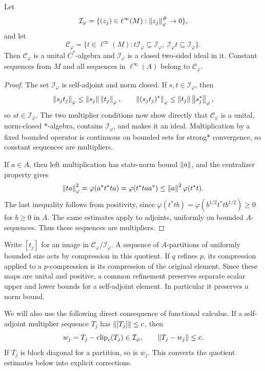 \begin{lemma}\label{lem:sequence-quotient}
Let
\[
 \mathcal I_\varphi=
 \{(z_j)\in\ell^\infty(M):\left\lVert z_j\right\rVert_\varphi^\#\to0\},
\]
and let
\[
 \mathcal C_\varphi=
 \{t\in\ell^\infty(M):
 t\mathcal I_\varphi\subseteq\mathcal I_\varphi,\
 \mathcal I_\varphi t\subseteq\mathcal I_\varphi\}.
\]
Then \(\mathcal C_\varphi\) is a unital \(C^*\)-algebra and
\(\mathcal I_\varphi\) is a closed two-sided ideal in it.
Constant sequences from \(M\) and all sequences in
\(\ell^\infty(A)\) belong to \(\mathcal C_\varphi\).
\end{lemma}
\begin{proof}
The set \(\mathcal I_\varphi\) is self-adjoint and norm closed.
If \(s,t\in\mathcal I_\varphi\), then
\[
 \left\lVert s_jt_j\right\rVert_\varphi\leq
 \left\lVert s_j\right\rVert\left\lVert t_j\right\rVert_\varphi,\qquad
 \left\lVert(s_jt_j)^*\right\rVert_\varphi\leq
 \left\lVert t_j\right\rVert\left\lVert s_j^*\right\rVert_\varphi ,
\]
so \(st\in\mathcal I_\varphi\).
The two multiplier conditions now show directly that
\(\mathcal C_\varphi\) is a unital, norm-closed \(*\)-algebra,
contains \(\mathcal I_\varphi\), and makes it an ideal.
Multiplication by a fixed bounded operator is continuous on bounded
sets for strong* convergence, so constant sequences are multipliers.

If \(a\in A\), then left multiplication has state-norm bound
\(\left\lVert a\right\rVert\), and the centralizer property gives
\[
 \left\lVert ta\right\rVert_\varphi^2
 =\varphi(a^*t^*ta)
 =\varphi(t^*t aa^*)
 \leq \left\lVert a\right\rVert^2\varphi(t^*t).
\]
The last inequality follows from positivity, since
\(\varphi(t^*t b)=\varphi(b^{1/2}t^*t b^{1/2})\geq0\) for
\(b\geq0\) in \(A\).
The same estimates apply to adjoints, uniformly on bounded
\(A\)-sequences. Thus these sequences are multipliers.
\end{proof}

Write \([t_j]\) for an image in
\(\mathcal C_\varphi/\mathcal I_\varphi\).
A sequence of \(A\)-partitions of uniformly bounded size acts by
compression in this quotient.
If \(q\) refines \(p\), its compression applied to a \(p\)-compression
is its compression of the original element.
Since these maps are unital and positive, a common refinement
preserves separate scalar upper and lower bounds for a self-adjoint
element. In particular it preserves a norm bound.

We will also use the following direct consequence of functional calculus.
If a self-adjoint multiplier sequence \(T_j\) has
\(\left\lVert[T_j]\right\rVert\leq c\), then
\[
 w_j=T_j-\operatorname{clip}_c(T_j)\in\mathcal I_\varphi,\qquad
 \left\lVert T_j-w_j\right\rVert\leq c.
\]
If \(T_j\) is block diagonal for a partition, so is \(w_j\).
This converts the quotient estimates below into explicit corrections.
